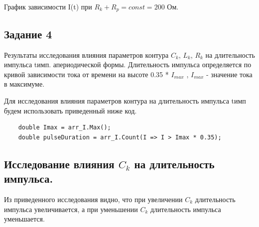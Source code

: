 \documentclass[a4paper,oneside,12pt]{extreport}
\begin{document}
График зависимости I(t) при $R_k + R_p = const = 200$ Ом. 
\begin{figure}[ht!]
\end{figure}

\newpage
\subsection{Задание 4}

Результаты исследования влияния параметров контура
$C_k$, $L_k$, $R_k$ на длительность импульса tимп. апериодической формы.
Длительность импульса определяется по кривой зависимости тока 
от времени на высоте 0.35 *  $I_{max}$  , $I_{max}$ - значение тока в максимуме.

Для исследования влияния параметров контура на длительность импульса tимп
будем использовать приведенный ниже код.

\begin{lstlisting}
    double Imax = arr_I.Max();
    double pulseDuration = arr_I.Count(I => I > Imax * 0.35);
\end{lstlisting}

\subsection{Исследование влияния $C_k$ на длительность импульса.}

Из приведенного исследования видно, что при увеличении $C_k$
длительность импульса увеличивается, а при уменьшении $C_k$
длительность импульса уменьшается.


\begin{figure}[ht!]
\end{figure}
\end{document}
